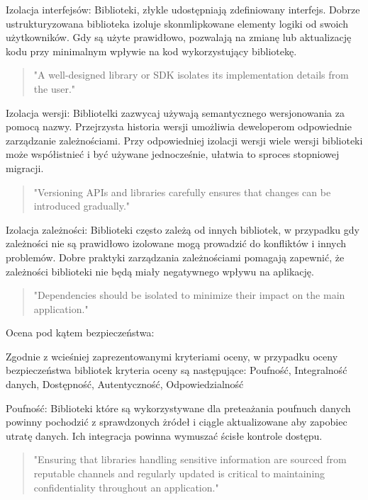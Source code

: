 \documentclass[runningheads,12pt]{llncs}
\begin{document}
Izolacja interfejsów: Biblioteki, złykle udostępniają zdefiniowany interfejs. Dobrze ustrukturyzowana biblioteka izoluje skonmlipkowane elementy logiki od swoich użytkowników. Gdy są użyte prawidłowo, pozwalają na zmianę lub aktualizację kodu przy minimalnym wpływie na kod wykorzystujący bibliotekę.

\begin{quote}
    "A well-designed library or SDK isolates its implementation details from the user." ~\cite[p. 75]{Essential}
\end{quote}

Izolacja wersji: Bibliotelki zazwycaj używają semantycznego wersjonowania za pomocą nazwy. Przejrzysta historia wersji umożliwia deweloperom odpowiednie zarządzanie zależnościami. Przy odpowiedniej izolacji wersji wiele wersji biblioteki może współistnieć i być używane jednocześnie, ułatwia to sproces stopniowej migracji.

\begin{quote}
    "Versioning APIs and libraries carefully ensures that changes can be introduced gradually." ~\cite[p. 172]{fowler2012patterns}
\end{quote}

Izolacja zależności: Biblioteki często zależą od innych bibliotek, w przypadku gdy zależności nie są prawidłowo izolowane mogą prowadzić do konfliktów i innych problemów. Dobre praktyki zarządzania zależnościami pomagają zapewnić, że zależności biblioteki nie będą miały negatywnego wpływu na aplikację.

\begin{quote}
    "Dependencies should be isolated to minimize their impact on the main application." ~\cite[p. 218]{martin2008clean}
\end{quote}

Ocena pod kątem bezpieczeństwa:

Zgodnie z wcieśniej zaprezentowanymi kryteriami oceny, w przypadku oceny bezpieczeństwa bibliotek kryteria oceny są następujące: Poufność, Integralność danych, Dostępność, Autentyczność, Odpowiedzialność

Poufność: Biblioteki które są wykorzystywane dla preteażania poufnuch danych powinny pochodzić z sprawdzonych żródeł i ciągle aktualizowane aby zapobiec utratę danych. Ich integracja powinna wymuszać ścisłe kontrole dostępu. 

\begin{quote}
    "Ensuring that libraries handling sensitive information are sourced from reputable channels and regularly updated is critical to maintaining confidentiality throughout an application." ~\cite[p. 82]{Essential}
\end{quote}
\end{document}
